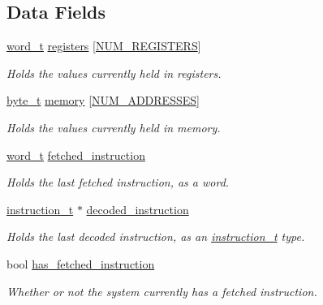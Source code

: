 \subsection*{Data Fields}
\begin{DoxyCompactItemize}
\item 
\hyperlink{global_8h_a0e7744482eed560726581dae7d3cb8b2}{word\+\_\+t} \hyperlink{structsystem__state__t_af042206b1a035449b5a10250fdc29e8f}{registers} \mbox{[}\hyperlink{global_8h_a5efff3a4a48efbf589e3a2320997d9b9}{N\+U\+M\+\_\+\+R\+E\+G\+I\+S\+T\+E\+RS}\mbox{]}
\begin{DoxyCompactList}\small\item\em Holds the values currently held in registers. \end{DoxyCompactList}\item 
\hyperlink{global_8h_a0661d7d1353e0bca70c64563f635b034}{byte\+\_\+t} \hyperlink{structsystem__state__t_ade4e6995025b3b8eeeb62bdb38408765}{memory} \mbox{[}\hyperlink{global_8h_ad1d337f69c5203493cb37cb203c33e24}{N\+U\+M\+\_\+\+A\+D\+D\+R\+E\+S\+S\+ES}\mbox{]}
\begin{DoxyCompactList}\small\item\em Holds the values currently held in memory. \end{DoxyCompactList}\item 
\hyperlink{global_8h_a0e7744482eed560726581dae7d3cb8b2}{word\+\_\+t} \hyperlink{structsystem__state__t_a9cb73fc3980fae6ad4eff34e8461d947}{fetched\+\_\+instruction}
\begin{DoxyCompactList}\small\item\em Holds the last fetched instruction, as a word. \end{DoxyCompactList}\item 
\hyperlink{structinstruction__t}{instruction\+\_\+t} $\ast$ \hyperlink{structsystem__state__t_ab53a970384d9c812a2a4c6e327b19a95}{decoded\+\_\+instruction}
\begin{DoxyCompactList}\small\item\em Holds the last decoded instruction, as an \hyperlink{structinstruction__t}{instruction\+\_\+t} type. \end{DoxyCompactList}\item 
bool \hyperlink{structsystem__state__t_afe188f4e4c4fed3fab882599cfdafa76}{has\+\_\+fetched\+\_\+instruction}
\begin{DoxyCompactList}\small\item\em Whether or not the system currently has a fetched instruction. \end{DoxyCompactList}\end{DoxyCompactItemize}


